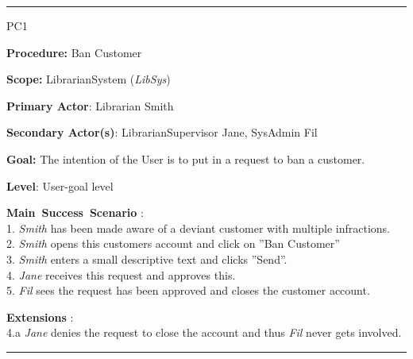 \vspace{0.5cm}
\hrule
\begin{lyxlist}{PC1}
\small{
\item [\textbf{Procedure:}] Ban Customer
\item [\textbf{Scope:}] LibrarianSystem (\emph{LibSys})
\item [\textbf{Primary Actor}:] Librarian Smith
\item [\textbf{Secondary Actor(s)}:] LibrarianSupervisor Jane, SysAdmin Fil
\item [\textbf{Goal:}] The intention of the User is to put in a request to ban a
customer.
\item [\textbf{Level}:] User-goal level
\item [\textbf{Main~Success~Scenario}]:\\
1. \emph{Smith} has been made aware of a deviant customer with multiple
infractions.\\
2. \emph{Smith} opens this customers account and click on ''Ban Customer''\\
3. \emph{Smith} enters a small descriptive text and clicks ''Send''.\\
4. \emph{Jane} receives this request and approves this.\\
5. \emph{Fil} sees the request has been approved and closes the customer
account.\\

\item [\textbf{Extensions}]:\\
4.a \emph{Jane} denies the request to close the account and thus \emph{Fil}
never gets involved.\\
}

\end{lyxlist}
\hrule

